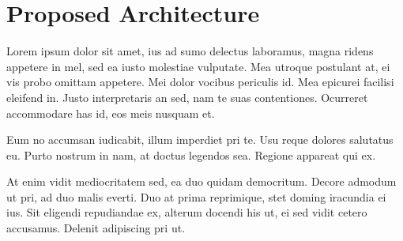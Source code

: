 \section{Proposed Architecture}

Lorem ipsum dolor sit amet, ius ad sumo delectus laboramus, magna ridens appetere in mel, sed ea iusto molestiae vulputate. Mea utroque postulant at, ei vis probo omittam appetere. Mei dolor vocibus periculis id. Mea epicurei facilisi eleifend in. Justo interpretaris an sed, nam te suas contentiones. Ocurreret accommodare has id, eos meis nusquam et.

Eum no accumsan iudicabit, illum imperdiet pri te. Usu reque dolores salutatus eu. Purto nostrum in nam, at doctus legendos sea. Regione appareat qui ex.

At enim vidit mediocritatem sed, ea duo quidam democritum. Decore admodum ut pri, ad duo malis everti. Duo at prima reprimique, stet doming iracundia ei ius. Sit eligendi repudiandae ex, alterum docendi his ut, ei sed vidit cetero accusamus. Delenit adipiscing pri ut.